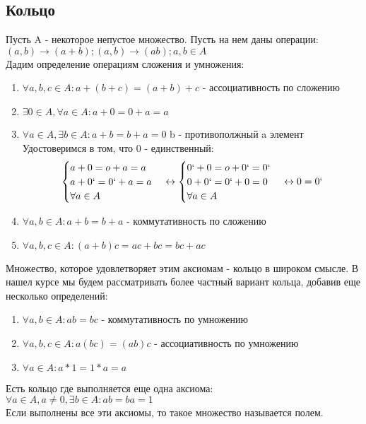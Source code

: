 \documentclass{article}
\begin{document}
\subsection{Кольцо}
Пусть A - некоторое непустое множество. Пусть на нем даны операции: $(a,b) \rightarrow (a+b); (a,b) \rightarrow (ab); a,b \in A$\\
Дадим определение операциям сложения и умножения:\\
\begin{enumerate}
\item $\forall a,b,c \in A : a+(b+c) =(a+b)+c$ - ассоциативность по сложению
\item $\exists 0 \in A, \forall a \in A: a+0=0+a=a$
\item $\forall a \in A, \exists b \in A: a+b = b+a = 0$ b - противополжный a элемент\\
Удостоверимся в том, что 0 - единственный: 
\begin{equation*}
\begin{cases}
a+0=o+a=a\\
a+0`=0`+a = a\\ \forall a \in A
\end {cases}
\leftrightarrow 
 \begin{cases}
0`+0=o+0`=0`\\
0+0`=0`+0 = 0\\ \forall a \in A
\end {cases}
\leftrightarrow 
0=0`
\end{equation*}
\item $\forall a,b \in A: a+b=b+a$ - коммутативность по сложению
\item $\forall a,b,c \in A: (a+b)c=ac+bc=bc+ac$
\end{enumerate}
Множество, которое удовлетворяет этим аксиомам - кольцо в широком смысле. В нашел курсе мы будем рассматривать более частный вариант кольца, добавив еще несколько определений:\\
\begin{enumerate}
\item $\forall a,b \in A: ab=bc$ - коммутативность по умножению
\item $\forall a,b,c \in A: a(bc) = (ab)c$ - ассоциативность по умножению
\item $\forall a \in A: a*1=1*a=a$
\end{enumerate}
Есть кольцо где выполняется еще одна аксиома:\\
$\forall a \in A, a \neq 0, \exists b \in A: ab=ba=1$\\
Если выполнены все эти аксиомы, то такое множество называется полем.\\
\end{document}
